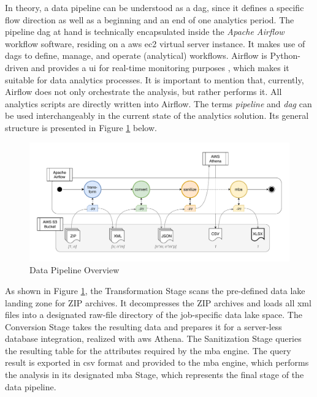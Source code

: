 In theory, a data pipeline can be understood as a \ac{dag}, since it defines a specific flow direction as well as a beginning and an end of one analytics period. The pipeline \ac{dag} at hand is technically encapsulated inside the \textit{Apache Airflow} workflow software, residing on a \ac{aws} \ac{ec2} virtual server instance. It makes use of \acp{dag} to define, manage, and operate (analytical) workflows. Airflow is Python-driven and provides a \ac{ui} for real-time monitoring purposes \cite{airflow}, which makes it suitable for data analytics processes. It is important to mention that, currently, Airflow does not only orchestrate the analysis, but rather performs it. All analytics scripts are directly written into Airflow. The terms \textit{pipeline} and \textit{\ac{dag}} can be used interchangeably in the current state of the analytics solution. Its general structure is presented in Figure \ref{fig:3-data-pipeline} below.

\begin{figure}[h!]
	\includegraphics[width=\linewidth]{main-matter/img/3-3-data-pipeline.pdf}
	\caption{Data Pipeline Overview}
	\label{fig:3-data-pipeline}	
\end{figure}

As shown in Figure \ref{fig:3-data-pipeline}, the Transformation Stage scans the pre-defined data lake landing zone for ZIP archives. It decompresses the ZIP archives and loads all \ac{xml} files into a designated raw-file directory of the job-specific data lake space. The Conversion Stage takes the resulting data and prepares it for a server-less database integration, realized with \ac{aws} Athena. The Sanitization Stage queries the resulting table for the attributes required by the \ac{mba} engine. The query result is exported in \ac{csv} format and provided to the \ac{mba} engine, which performs the analysis in its designated \ac{mba} Stage, which represents the final stage of the data pipeline.

